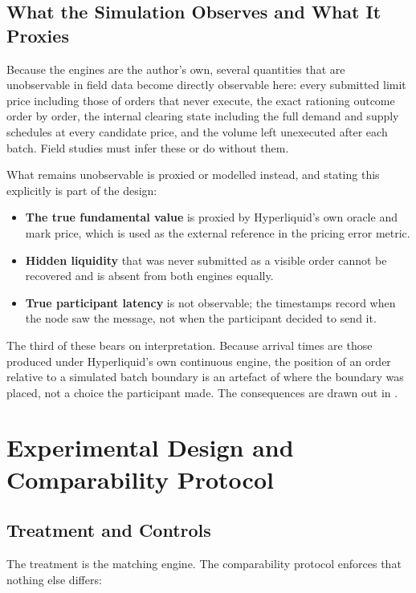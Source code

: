\subsection{What the Simulation Observes and What It Proxies}

Because the engines are the author's own, several quantities that are
unobservable in field data become directly observable here: every
submitted limit price including those of orders that never execute, the
exact rationing outcome order by order, the internal clearing state
including the full demand and supply schedules at every candidate price,
and the volume left unexecuted after each batch. Field studies must
infer these or do without them.

What remains unobservable is proxied or modelled instead, and stating
this explicitly is part of the design:

\begin{itemize}
  \item \textbf{The true fundamental value} is proxied by Hyperliquid's
  own oracle and mark price, which is used as the external reference in
  the pricing error metric.
  \item \textbf{Hidden liquidity} that was never submitted as a visible
  order cannot be recovered and is absent from both engines equally.
  \item \textbf{True participant latency} is not observable; the
  timestamps record when the node saw the message, not when the
  participant decided to send it.
\end{itemize}

The third of these bears on interpretation. Because arrival times are
those produced under Hyperliquid's own continuous engine, the position
of an order relative to a simulated batch boundary is an artefact of
where the boundary was placed, not a choice the participant made. The
consequences are drawn out in .

\section{Experimental Design and Comparability Protocol}
\label{sec:experiments}

\subsection{Treatment and Controls}

The treatment is the matching engine. The comparability protocol
enforces that nothing else differs:

